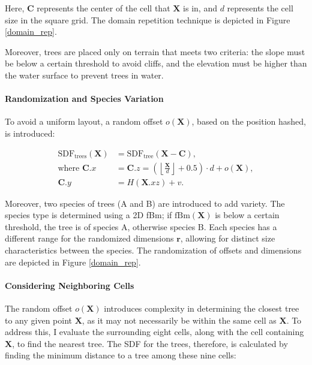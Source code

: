 Here, $\mathbf{C}$ represents the center of the cell that $\mathbf{X}$ is in, and $d$ represents the cell size in the square grid. The domain repetition technique is depicted in Figure \ref{domain_rep}.

Moreover, trees are placed only on terrain that meets two criteria: the slope must be below a certain threshold to avoid cliffs, and the elevation must be higher than the water surface to prevent trees in water.

\paragraph{Randomization and Species Variation}
To avoid a uniform layout, a random offset $o(\mathbf{X})$, based on the position hashed, is introduced:

\begin{equation}
\begin{aligned}
\text{SDF}_\text{trees}(\mathbf{X}) &= \text{SDF}_\text{tree}(\mathbf{X} - \mathbf{C}), \\
\text{where } \mathbf{C}.x &= \mathbf{C}.z = \left(\left\lfloor \frac{\mathbf{X}}{d} \right\rfloor + 0.5\right) \cdot d + o(\mathbf{X}), \\
\mathbf{C}.y &= H(\mathbf{X}.{xz}) + v.
\end{aligned}
\end{equation}

Moreover, two species of trees (A and B) are introduced to add variety. The species type is determined using a 2D fBm; if $\text{fBm}(\mathbf{X})$ is below a certain threshold, the tree is of species A, otherwise species B. Each species has a different range for the randomized dimensions $\mathbf{r}$, allowing for distinct size characteristics between the species. The randomization of offsets and dimensions are depicted in Figure \ref{domain_rep}.

\paragraph{Considering Neighboring Cells}
The random offset $o(\mathbf{X})$ introduces complexity in determining the closest tree to any given point $\mathbf{X}$, as it may not necessarily be within the same cell as $\mathbf{X}$. To address this, I evaluate the surrounding eight cells, along with the cell containing $\mathbf{X}$, to find the nearest tree. The SDF for the trees, therefore, is calculated by finding the minimum distance to a tree among these nine cells:

